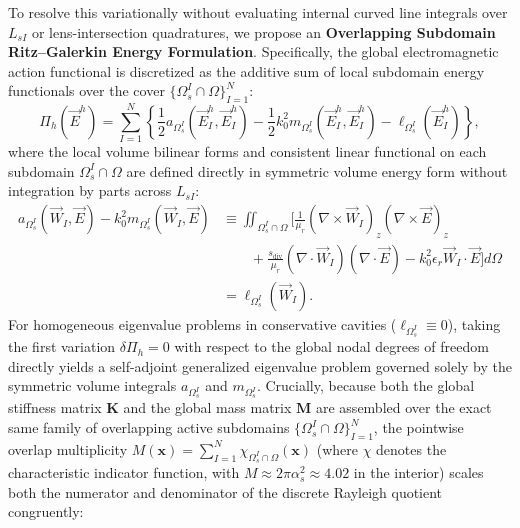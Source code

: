 \documentclass[VANCOUVER,Times1COL]{WileyNJD-v5}
\begin{document}
To resolve this variationally without evaluating internal curved line integrals over $L_{sI}$ or lens-intersection quadratures, we propose an \textbf{Overlapping Subdomain Ritz--Galerkin Energy Formulation}. Specifically, the global electromagnetic action functional is discretized as the additive sum of local subdomain energy functionals over the cover $\{\Omega_s^I \cap \Omega\}_{I=1}^N$:
\begin{equation}
    \Pi_h(\vec{E}^h) = \sum_{I=1}^N \left\{ \frac{1}{2} a_{\Omega_s^I}(\vec{E}_I^h, \vec{E}_I^h) - \frac{1}{2} k_0^2 m_{\Omega_s^I}(\vec{E}_I^h, \vec{E}_I^h) - \ell_{\Omega_s^I}(\vec{E}_I^h) \right\},
\end{equation}
where the local volume bilinear forms and consistent linear functional on each subdomain $\Omega_s^I \cap \Omega$ are defined directly in symmetric volume energy form without integration by parts across $L_{sI}$:
\begin{equation}
    \begin{aligned}
        a_{\Omega_s^I}(\vec{W}_I, \vec{E}) - k_0^2 m_{\Omega_s^I}(\vec{W}_I, \vec{E}) & \equiv \iint_{\Omega_s^I \cap \Omega} \bigg[ \frac{1}{\mu_r} (\nabla \times \vec{W}_I)_z (\nabla \times \vec{E})_z \\
                                                                                      & \qquad + \frac{s_{\mathrm{div}}}{\mu_r} (\nabla \cdot \vec{W}_I) (\nabla \cdot \vec{E}) - k_0^2 \epsilon_r \vec{W}_I \cdot \vec{E} \bigg] d\Omega \\
                                                                                      & = \ell_{\Omega_s^I}(\vec{W}_I).
    \end{aligned}
    \label{eq:volume_energy_form}
\end{equation}
For homogeneous eigenvalue problems in conservative cavities ($\ell_{\Omega_s^I} \equiv 0$), taking the first variation $\delta \Pi_h = 0$ with respect to the global nodal degrees of freedom directly yields a self-adjoint generalized eigenvalue problem governed solely by the symmetric volume integrals $a_{\Omega_s^I}$ and $m_{\Omega_s^I}$. Crucially, because both the global stiffness matrix $\mathbf{K}$ and the global mass matrix $\mathbf{M}$ are assembled over the exact same family of overlapping active subdomains $\{\Omega_s^I \cap \Omega\}_{I=1}^N$, the pointwise overlap multiplicity $M(\mathbf{x}) = \sum_{I=1}^N \chi_{\Omega_s^I \cap \Omega}(\mathbf{x})$ (where $\chi$ denotes the characteristic indicator function, with $M \approx 2\pi \alpha_s^2 \approx 4.02$ in the interior) scales both the numerator and denominator of the discrete Rayleigh quotient congruently:
\end{document}
